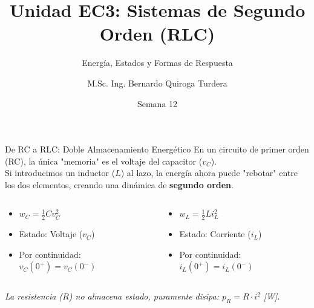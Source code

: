 \documentclass[aspectratio=169, 10pt]{beamer}
\title[Dinámica de Segundo Orden]{Unidad EC3: Sistemas de Segundo Orden (RLC)}
\subtitle{Energía, Estados y Formas de Respuesta}
\author[B. Quiroga Turdera]{M.Sc. Ing. Bernardo Quiroga Turdera}
\institute[UCB Tarija]{Universidad Católica Boliviana ``San Pablo'' --- Sede Tarija}
\date{Semana 12}
\begin{document}
\begin{frame}
    \titlepage
\end{frame}

\begin{frame}{De RC a RLC: Doble Almacenamiento Energético}
    En un circuito de primer orden (RC), la única "memoria" es el voltaje del capacitor ($v_C$). \\
    Si introducimos un inductor ($L$) al lazo, la energía ahora puede "rebotar" entre los dos elementos, creando una dinámica de \textbf{segundo orden}.
    
    \vspace{0.4cm}
    \begin{columns}[T]
        \begin{tcolorbox}[colback=white, colframe=ucbblue, title=\textbf{El Capacitor}]
            \begin{itemize}
                \item $w_C = \frac{1}{2} C v_C^2$ \quad [Joules]
                \item Estado: Voltaje ($v_C$)
                \item Por continuidad: $v_C(0^+) = v_C(0^-)$
            \end{itemize}
        \end{tcolorbox}

        \begin{tcolorbox}[colback=white, colframe=ucbblue, title=\textbf{El Inductor}]
            \begin{itemize}
                \item $w_L = \frac{1}{2} L i_L^2$ \quad [Joules]
                \item Estado: Corriente ($i_L$)
                \item Por continuidad: $i_L(0^+) = i_L(0^-)$
            \end{itemize}
        \end{tcolorbox}
    \end{columns}
    \vspace{0.4cm}
    \textit{La resistencia ($R$) no almacena estado, puramente disipa: $p_R = R \cdot i^2$ [W].}
\end{frame}
\end{document}
